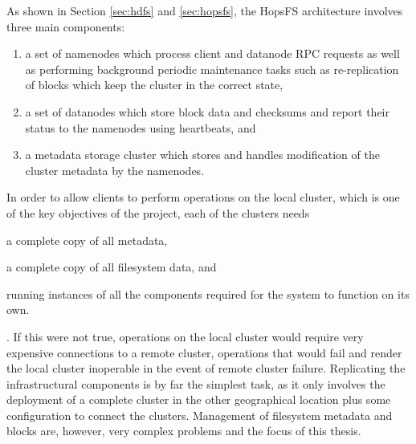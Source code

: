 As shown in Section \ref{sec:hdfs} and \ref{sec:hopsfs}, the HopsFS architecture involves three main components:
\begin{enumerate}
    \item a set of namenodes which process client and datanode RPC requests as well as performing background periodic maintenance tasks such as re-replication of blocks which keep the cluster  in the correct state,
    \item a set of datanodes which store block data and checksums and report their status to the namenodes using heartbeats, and
    \item a metadata storage cluster which stores and handles modification of the cluster metadata by the namenodes.
\end{enumerate}
In order to allow clients to perform operations on the local cluster, which is one of the key objectives of the project, each of the clusters needs
\begin{inparaenum}[i)]
    \item a complete copy of all metadata,
    \item a complete copy of all filesystem data, and
    \item running instances of all the components required for the system to function on its own.
\end{inparaenum}.
If this were not true, operations on the local cluster would require very expensive connections to a remote cluster, operations that would fail and render the local cluster inoperable in the event of remote cluster failure.
Replicating the infrastructural components is by far the simplest task, as it only involves the deployment of a complete cluster in the other geographical location plus some configuration to connect the clusters.
Management of filesystem metadata and blocks are, however, very complex problems and the focus of this thesis.